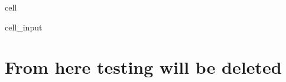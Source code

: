 \documentclass[letterpaper,10pt,english]{jupyterBook}
\begin{document}
\begin{sphinxuseclass}{cell}\begin{sphinxVerbatimInput}

\begin{sphinxuseclass}{cell_input}
\begin{sphinxVerbatim}[commandchars=\\\{\}]
  
  
  
  
  
\end{sphinxVerbatim}

\end{sphinxuseclass}\end{sphinxVerbatimInput}

\end{sphinxuseclass}

\section{From here testing \sphinxhyphen{} will be deleted}
\label{\detokenize{content/howto/onboard/eviews/onboard many models from wf1:from-here-testing-will-be-deleted}}
\end{document}
